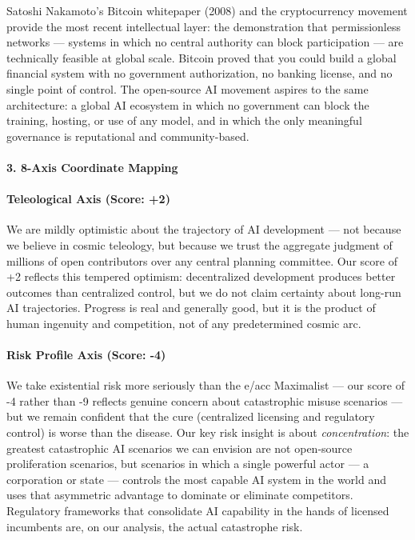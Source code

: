 Satoshi Nakamoto's Bitcoin whitepaper (2008) and the cryptocurrency
movement provide the most recent intellectual layer: the demonstration
that permissionless networks --- systems in which no central authority
can block participation --- are technically feasible at global scale.
Bitcoin proved that you could build a global financial system with no
government authorization, no banking license, and no single point of
control. The open-source AI movement aspires to the same architecture: a
global AI ecosystem in which no government can block the training,
hosting, or use of any model, and in which the only meaningful
governance is reputational and community-based.

\paragraph{3. 8-Axis Coordinate
Mapping}\label{axis-coordinate-mapping-12}

\paragraph{Teleological Axis (Score:
+2)}\label{teleological-axis-score-2}

We are mildly optimistic about the trajectory of AI development --- not
because we believe in cosmic teleology, but because we trust the
aggregate judgment of millions of open contributors over any central
planning committee. Our score of +2 reflects this tempered optimism:
decentralized development produces better outcomes than centralized
control, but we do not claim certainty about long-run AI trajectories.
Progress is real and generally good, but it is the product of human
ingenuity and competition, not of any predetermined cosmic arc.

\paragraph{Risk Profile Axis (Score:
-4)}\label{risk-profile-axis-score--4}

We take existential risk more seriously than the e/acc Maximalist ---
our score of -4 rather than -9 reflects genuine concern about
catastrophic misuse scenarios --- but we remain confident that the cure
(centralized licensing and regulatory control) is worse than the
disease. Our key risk insight is about \emph{concentration}: the
greatest catastrophic AI scenarios we can envision are not open-source
proliferation scenarios, but scenarios in which a single powerful actor
--- a corporation or state --- controls the most capable AI system in
the world and uses that asymmetric advantage to dominate or eliminate
competitors. Regulatory frameworks that consolidate AI capability in the
hands of licensed incumbents are, on our analysis, the actual
catastrophe risk.

